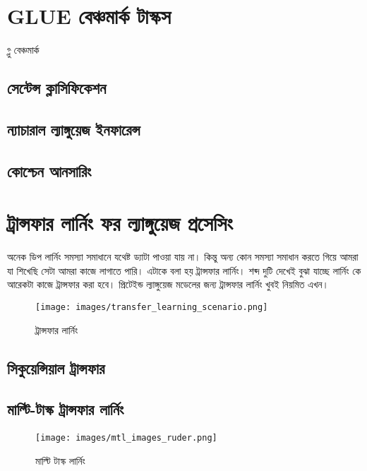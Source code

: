 \documentclass{article}[book]
\begin{document}
\section{GLUE বেঞ্চমার্ক টাস্কস}
গ্লু বেঞ্চমার্ক \cite{wang-etal-2018-glue}

\subsection{সেন্টেন্স ক্লাসিফিকেশন}
\subsection{ন্যাচারাল ল্যাঙ্গুয়েজ  ইনফারেন্স}
\subsection{কোশ্চেন আনসারিং}


\section{ট্রান্সফার লার্নিং ফর ল্যাঙ্গুয়েজ প্রসেসিং}
অনেক ডিপ লার্নিং সমস্যা সমাধানে যথেষ্ট ড্যাটা পাওয়া যায় না। কিন্তু অন্য কোন সমস্যা সমাধান করতে গিয়ে আমরা যা শিখেছি সেটা আমরা কাজে লাগাতে পারি। 
এটাকে বলা হয় ট্রান্সফার লার্নিং। শব্দ দুটি দেখেই বুঝা যাচ্ছে লার্নিং কে আরেকটা কাজে ট্রান্সফার করা হবে। 
প্রিটেইন্ড ল্যাঙ্গুয়েজ মডেলের জন্য ট্রান্সফার লার্নিং খুবই নিয়মিত এখন। 

\begin{figure}[htbp] %
   \centering
   \texttt{[image: images/transfer\_learning\_scenario.png]} 
   \caption{ট্রান্সফার লার্নিং}
   \label{fig:ruder_transfer_learning}
\end{figure} 

\subsection{সিকুয়েন্সিয়াল ট্রান্সফার}
\subsection{মাল্টি-টাস্ক ট্রান্সফার লার্নিং}

\begin{figure}[htbp] %
   \centering
   \texttt{[image: images/mtl\_images\_ruder.png]} 
   \caption{মাল্টি টাস্ক লার্নিং}
   \label{fig:ruder_mtl}
\end{figure} 
\end{document}
